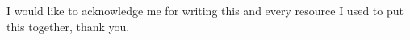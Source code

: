 \justify
\quad
I would like to acknowledge me for writing this and every resource I used to put this together, thank you.
\newpage